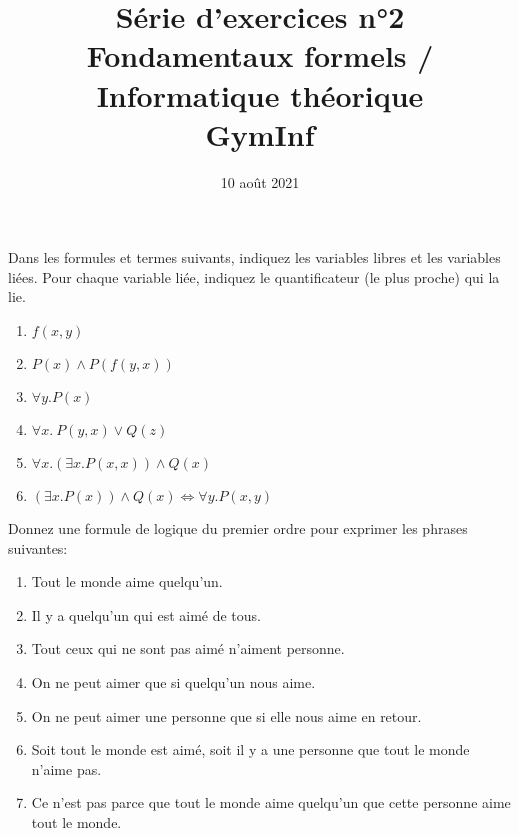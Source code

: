 \documentclass[12pt,french,a4paper]{article}
\begin{document}
\title{\vspace{-2cm}Série d'exercices n°2\\\large{Fondamentaux formels / Informatique théorique\\GymInf}}
\date{\vspace{-1cm}10 août 2021}

\maketitle

\begin{question}

Dans les formules et termes suivants, indiquez les variables libres et les variables liées.
Pour chaque variable liée, indiquez le quantificateur (le plus proche) qui la lie.

\begin{enumerate}
\item $f(x, y)$
\item $P(x) \wedge P(f(y, x))$
\item $\forall y. P(x)$
\item $\forall x.\ P(y, x) \vee Q(z)$
\item $\forall x. (\exists x. P(x, x)) \wedge Q(x)$
\item $(\exists x. P(x)) \wedge Q(x) \iff \forall y. P(x, y)$
\end{enumerate}


\end{question}

\begin{question}

Donnez une formule de logique du premier ordre pour exprimer les phrases suivantes:
\begin{enumerate}
\item Tout le monde aime quelqu'un.
\item Il y a quelqu'un qui est aimé de tous.
\item Tout ceux qui ne sont pas aimé n'aiment personne.
\item On ne peut aimer que si quelqu'un nous aime.
\item On ne peut aimer une personne que si elle nous aime en retour.
\item Soit tout le monde est aimé, soit il y a une personne que tout le monde n'aime pas.
\item Ce n'est pas parce que tout le monde aime quelqu'un que cette personne aime tout le monde.
\end{enumerate}
\end{question}
\end{document}
